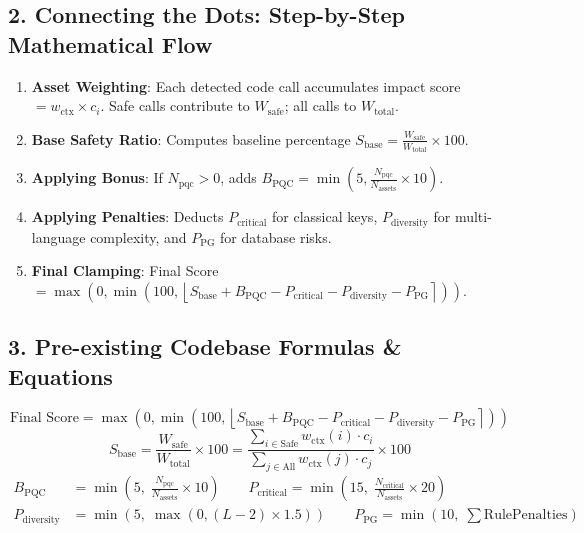 \documentclass[11pt,a4paper,landscape]{article}
\begin{document}
\subsection{2. Connecting the Dots: Step-by-Step Mathematical Flow}
\begin{enumerate}
    \item \textbf{Asset Weighting}: Each detected code call accumulates impact score $= w_{\text{ctx}} \times c_i$. Safe calls contribute to $W_{\text{safe}}$; all calls to $W_{\text{total}}$.
    \item \textbf{Base Safety Ratio}: Computes baseline percentage $S_{\text{base}} = \frac{W_{\text{safe}}}{W_{\text{total}}} \times 100$.
    \item \textbf{Applying Bonus}: If $N_{\text{pqc}} > 0$, adds $B_{\text{PQC}} = \min\left(5, \frac{N_{\text{pqc}}}{N_{\text{assets}}} \times 10\right)$.
    \item \textbf{Applying Penalties}: Deducts $P_{\text{critical}}$ for classical keys, $P_{\text{diversity}}$ for multi-language complexity, and $P_{\text{PG}}$ for database risks.
    \item \textbf{Final Clamping}: Final Score $= \max\left(0, \min\left(100, \left\lfloor S_{\text{base}} + B_{\text{PQC}} - P_{\text{critical}} - P_{\text{diversity}} - P_{\text{PG}} \right\rceil\right)\right)$.
\end{enumerate}

\subsection{3. Pre-existing Codebase Formulas \& Equations}
\[
\text{Final Score} = \max\left(0, \min\left(100, \left\lfloor S_{\text{base}} + B_{\text{PQC}} - P_{\text{critical}} - P_{\text{diversity}} - P_{\text{PG}} \right\rceil\right)\right)
\]
\[
S_{\text{base}} = \frac{W_{\text{safe}}}{W_{\text{total}}} \times 100 = \frac{\sum_{i \in \text{Safe}} w_{\text{ctx}}(i) \cdot c_i}{\sum_{j \in \text{All}} w_{\text{ctx}}(j) \cdot c_j} \times 100
\]
\begin{align*}
B_{\text{PQC}} &= \min\left(5, \; \frac{N_{\text{pqc}}}{N_{\text{assets}}} \times 10\right) \qquad P_{\text{critical}} = \min\left(15, \; \frac{N_{\text{critical}}}{N_{\text{assets}}} \times 20\right) \\
P_{\text{diversity}} &= \min\left(5, \; \max\left(0, (L - 2) \times 1.5\right)\right) \qquad P_{\text{PG}} = \min\left(10, \; \sum \text{RulePenalties}\right)
\end{align*}
\end{document}
